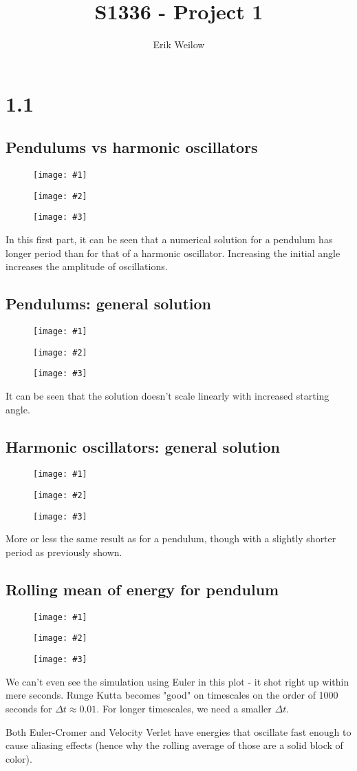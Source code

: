 \documentclass[11pt]{article}
\title{S1336 - Project 1}%
\author{Erik Weilow} %
\newcommand{\triplefigure}[3]{
\begin{figure}[H]
  \centering
  \begin{minipage}{0.3\textwidth}
    \centering
    \texttt{[image: \#1]}
  \end{minipage}
  \begin{minipage}{0.3\textwidth}
    \centering
    \texttt{[image: \#2]}
  \end{minipage}
  \begin{minipage}{0.3\textwidth}
    \centering
    \texttt{[image: \#3]}
  \end{minipage}
\end{figure}
}
\begin{document}
\maketitle
\newpage

\section*{1.1}

\subsection*{Pendulums vs harmonic oscillators}
\triplefigure{./plots/1_1/comparison_1.png}{./plots/1_1/comparison_2.png}{./plots/1_1/comparison_3.png}
In this first part, it can be seen that a numerical solution for a pendulum has longer period than for that of a harmonic oscillator.
Increasing the initial angle increases the amplitude of oscillations.

\subsection*{Pendulums: general solution}
\triplefigure{./plots/1_1/sol_pendulum_1.png}{./plots/1_1/sol_pendulum_2.png}{./plots/1_1/sol_pendulum_3.png}
It can be seen that the solution doesn't scale linearly with increased starting angle. 

\subsection*{Harmonic oscillators: general solution}
\triplefigure{./plots/1_1/sol_harmonic_1.png}{./plots/1_1/sol_harmonic_2.png}{./plots/1_1/sol_harmonic_3.png}
More or less the same result as for a pendulum, though with a slightly shorter period as previously shown. 

\subsection*{Rolling mean of energy for pendulum}
\triplefigure{./plots/1_1/rollingMean_1.png}{./plots/1_1/rollingMean_2.png}{./plots/1_1/rollingMean_3.png}
We can't even see the simulation using Euler in this plot - it shot right up within mere seconds.
Runge Kutta becomes "good" on timescales on the order of 1000 seconds for $\Delta t \approx 0.01$.
For longer timescales, we need a smaller $\Delta t$.

Both Euler-Cromer and Velocity Verlet have energies that oscillate fast enough to cause aliasing effects (hence why the rolling average of those are a solid block of color).
\end{document}
